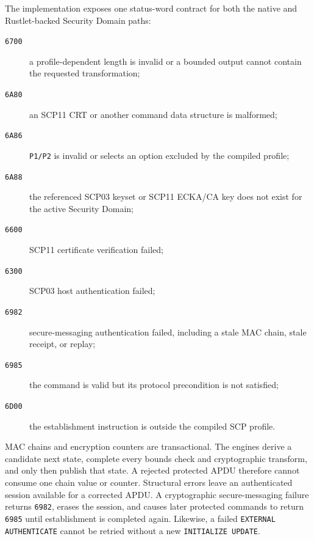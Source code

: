 The implementation exposes one status-word contract for both the native and
Rustlet-backed Security Domain paths:
\begin{description}
\item[\texttt{6700}] a profile-dependent length is invalid or a bounded output
      cannot contain the requested transformation;
\item[\texttt{6A80}] an SCP11 CRT or another command data structure is
      malformed;
\item[\texttt{6A86}] \texttt{P1/P2} is invalid or selects an option excluded
      by the compiled profile;
\item[\texttt{6A88}] the referenced SCP03 keyset or SCP11 ECKA/CA key does not
      exist for the active Security Domain;
\item[\texttt{6600}] SCP11 certificate verification failed;
\item[\texttt{6300}] SCP03 host authentication failed;
\item[\texttt{6982}] secure-messaging authentication failed, including a stale
      MAC chain, stale receipt, or replay;
\item[\texttt{6985}] the command is valid but its protocol precondition is not
      satisfied;
\item[\texttt{6D00}] the establishment instruction is outside the compiled
      SCP profile.
\end{description}

MAC chains and encryption counters are transactional. The engines derive a
candidate next state, complete every bounds check and cryptographic transform,
and only then publish that state. A rejected protected APDU therefore cannot
consume one chain value or counter. Structural errors leave an authenticated
session available for a corrected APDU. A cryptographic secure-messaging
failure returns \texttt{6982}, erases the session, and causes later protected
commands to return \texttt{6985} until establishment is completed again.
Likewise, a failed \texttt{EXTERNAL AUTHENTICATE} cannot be retried without a
new \texttt{INITIALIZE UPDATE}.
